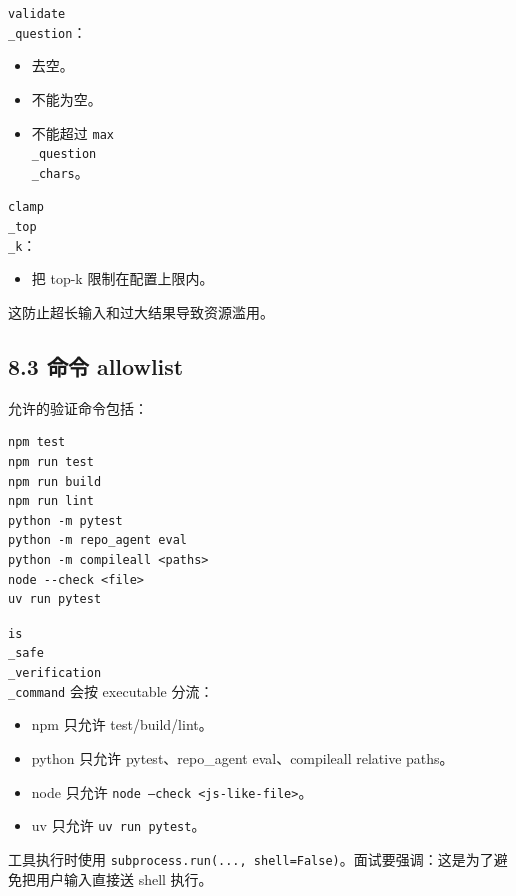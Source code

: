 \documentclass[UTF8,12pt,openany]{ctexbook}
\begin{document}
\texttt{validate\\_question}：\par

\begin{itemize}
\item 去空。
\item 不能为空。
\item 不能超过 \texttt{max\\_question\\_chars}。
\end{itemize}

\texttt{clamp\\_top\\_k}：\par

\begin{itemize}
\item 把 top-k 限制在配置上限内。
\end{itemize}

这防止超长输入和过大结果导致资源滥用。\par

\subsection{8.3 命令 allowlist}

允许的验证命令包括：\par

\begin{lstlisting}
npm test
npm run test
npm run build
npm run lint
python -m pytest
python -m repo_agent eval
python -m compileall <paths>
node --check <file>
uv run pytest
\end{lstlisting}

\texttt{is\\_safe\\_verification\\_command} 会按 executable 分流：\par

\begin{itemize}
\item npm 只允许 test/build/lint。
\item python 只允许 pytest、repo\_agent eval、compileall relative paths。
\item node 只允许 \texttt{node --check <js-like-file>}。
\item uv 只允许 \texttt{uv run pytest}。
\end{itemize}

工具执行时使用 \texttt{subprocess.run(..., shell=False)}。面试要强调：这是为了避免把用户输入直接送 shell 执行。\par
\end{document}
